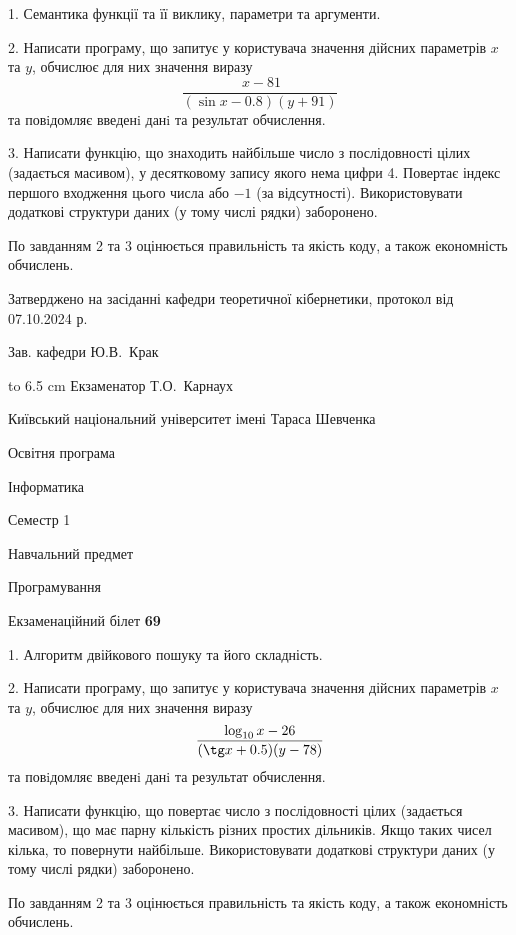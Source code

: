 \documentclass[12pt, ukrainian]{article}
\begin{document}
{%
1. Семантика функції та її виклику, параметри та аргументи.%
\par
2. Написати програму, що запитує у користувача значення дійсних параметрів $x$ та $y$, обчислює для них значення виразу 
$$\frac{\ x - 81}{(\sin x - 0.8) (y + 91)}$$ 
та повiдомляє введенi данi та результат обчислення.

\par
3. Написати функцію, що знаходить найбільше число з послідовності цілих (задається масивом), у десятковому запису якого нема цифри 4. Повертає індекс першого входження цього числа або $-1$ (за відсутності). Використовувати додаткові структури даних (у тому числі рядки) заборонено.

По завданням 2 та 3 оцінюється правильність та якість коду, а також економність обчислень.

}
{\smallskip\smallskip \begin {scriptsize} Затверджено на засіданні кафедри теоретичної кібернетики, протокол   від   07.10.2024 р.\par\smallskip\smallskip\smallskip\smallskip
{\parbox {6.5 cm} {Зав. кафедри \dotfill Ю.В.~Крак}}\hspace {0.7cm} {\hbox to 6.5 cm { Екзаменатор \dotfill Т.О.~Карнаух}} \end{scriptsize}}
\vspace{0.9cm}
{{\begin {scriptsize}\par
{ \center  Київський національний університет імені Тараса Шевченка \par}
{\parbox {5 cm}{Освітня програма \hfill}{\parbox {7 cm}{Інформатика\hfill}}\parbox {6 cm}{\hfill Семестр 1}}\par
{\parbox {5 cm} {Навчальний предмет \hfill}\parbox {7 cm}{Програмування \hfill}\parbox {6cm}{\hfill}\par}\vspace{-15pt} \end{scriptsize}}{\center Екзаменаційний білет \No \textbf { 69 }\par}}
{%
1. Алгоритм двійкового пошуку та його складність.%
\par
2. Написати програму, що запитує у користувача значення дійсних параметрів $x$ та $y$, обчислює для них значення виразу 
$$\frac{\log_{10} x - 26}{(\tg x + 0.5) (y - 78)}$$ 
та повiдомляє введенi данi та результат обчислення.

\par
3. Написати функцію, що повертає число з послідовності цілих (задається масивом), що має парну кількість різних простих дільників. Якщо таких чисел кілька, то повернути найбільше. Використовувати додаткові структури даних (у тому числі рядки) заборонено.

По завданням 2 та 3 оцінюється правильність та якість коду, а також економність обчислень.

}
\end{document}
